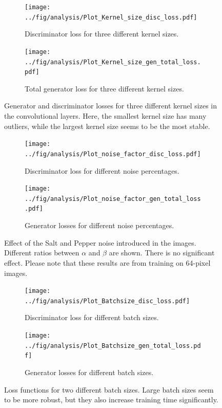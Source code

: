 \documentclass[fleqn,usenatbib,twocolumn]{mnras}
\begin{document}
\begin{figure}
	\centering
	\begin{subfigure}{\linewidth}
		\centering
		\texttt{[image: ../fig/analysis/Plot\_Kernel\_size\_disc\_loss.pdf]}
		\caption{Discriminator loss for three different kernel sizes. }
		\label{fig:Plot_kernel_size_discloss}
	\end{subfigure}\hfill
	\begin{subfigure}{\linewidth}
		\centering
		\texttt{[image: ../fig/analysis/Plot\_Kernel\_size\_gen\_total\_loss.pdf]}
		\caption{Total generator loss for three different kernel sizes.}
		\label{fig:Plot_kernel_size_genloss}
	\end{subfigure}\hfill
	\caption{Generator and discriminator losses for three different kernel sizes in the convolutional layers. Here, the smallest kernel size has many outliers, while the largest kernel size seems to be the most stable.}
	\label{fig:Plot_kernel_size_loss}
\end{figure}
\begin{figure}
	\centering
	\begin{subfigure}{0.5\linewidth}
		\centering
		\texttt{[image: ../fig/analysis/Plot\_noise\_factor\_disc\_loss.pdf]}
		\caption{Discriminator loss for different noise percentages.}
		\label{fig:Plot_noise_discloss}
	\end{subfigure}\hfill
	\begin{subfigure}{0.5\linewidth}
		\centering
		\texttt{[image: ../fig/analysis/Plot\_noise\_factor\_gen\_total\_loss.pdf]}
		\caption{Generator losses for different noise percentages.}
		\label{fig:Plot_noise_genloss}
	\end{subfigure}\hfill
	\caption{Effect of the Salt and Pepper noise introduced in the images. Different ratios between $\alpha$ and $\beta$ are shown. There is no significant effect. Please note that these results are from training on 64-pixel images.}
	\label{fig:Plot_noise_loss}
\end{figure}
\begin{figure}
	\centering
	\begin{subfigure}{0.5\linewidth}
		\centering
		\texttt{[image: ../fig/analysis/Plot\_Batchsize\_disc\_loss.pdf]}
		\caption{Discriminator loss for different batch sizes.}
		\label{fig:Plot_batchsize_discloss}
	\end{subfigure}\hfill
	\begin{subfigure}{0.5\linewidth}
		\centering
		\texttt{[image: ../fig/analysis/Plot\_Batchsize\_gen\_total\_loss.pdf]}
		\caption{Generator losses for different batch sizes.}
		\label{fig:Plot_batchsize_genloss}
	\end{subfigure}\hfill
	\caption{Loss functions for two different batch sizes. Large batch sizes seem to be more robust, but they also increase training time significantly. }
	\label{fig:Plot_batchsize_loss}
\end{figure}
\end{document}
